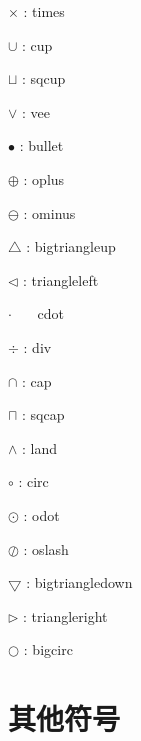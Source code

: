 \documentclass[UTF8]{ctexart}
\begin{document}
\begin{multicols}{2}
$\times$ : times\par
$\cup$ : cup \par
$\sqcup$ : sqcup \par
$\vee$ : vee \par
$\bullet$ : bullet\par
$\oplus$ : oplus \par
$\ominus$ : ominus\par
$\bigtriangleup$ : bigtriangleup \par
$\triangleleft$ : triangleleft\par
$\cdot$ \ \ \ cdot\par

$\div$ : div\par
$\cap$ : cap \par
$\sqcap$ : sqcap \par
$\land$ : land \par
$\circ$ : circ\par
$\odot$ : odot\par
$\oslash$ : oslash \par
$\bigtriangledown$ : bigtriangledown \par
$\triangleright$ : triangleright\par
$\bigcirc$ : bigcirc\par


\end{multicols}

\newpage

\section{其他符号}
\end{document}

